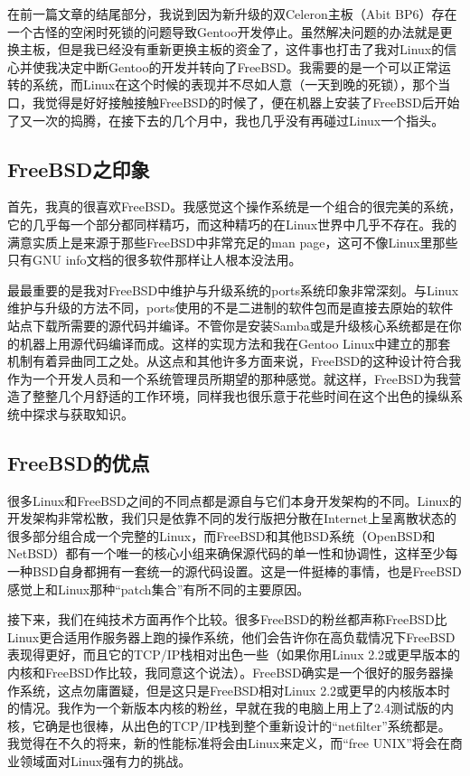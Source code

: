 在前一篇文章的结尾部分，我说到因为新升级的双Celeron主板（Abit BP6）存在一个古怪的空闲时死锁的问题导致Gentoo开发停止。虽然解决问题的办法就是更换主板，但是我已经没有重新更换主板的资金了，这件事也打击了我对Linux的信心并使我决定中断Gentoo的开发并转向了FreeBSD。我需要的是一个可以正常运转的系统，而Linux在这个时候的表现并不尽如人意（一天到晚的死锁），那个当口，我觉得是好好接触接触FreeBSD的时候了，便在机器上安装了FreeBSD后开始了又一次的捣腾，在接下去的几个月中，我也几乎没有再碰过Linux一个指头。

\subsection{FreeBSD之印象}

首先，我真的很喜欢FreeBSD。我感觉这个操作系统是一个组合的很完美的系统，它的几乎每一个部分都同样精巧，而这种精巧的在Linux世界中几乎不存在。我的满意实质上是来源于那些FreeBSD中非常充足的man page，这可不像Linux里那些只有GNU info文档的很多软件那样让人根本没法用。

最最重要的是我对FreeBSD中维护与升级系统的ports系统印象非常深刻。与Linux维护与升级的方法不同，ports使用的不是二进制的软件包而是直接去原始的软件站点下载所需要的源代码并编译。不管你是安装Samba或是升级核心系统都是在你的机器上用源代码编译而成。这样的实现方法和我在Gentoo Linux中建立的那套机制有着异曲同工之处。从这点和其他许多方面来说，FreeBSD的这种设计符合我作为一个开发人员和一个系统管理员所期望的那种感觉。就这样，FreeBSD为我营造了整整几个月舒适的工作环境，同样我也很乐意于花些时间在这个出色的操纵系统中探求与获取知识。

\subsection{FreeBSD的优点}

很多Linux和FreeBSD之间的不同点都是源自与它们本身开发架构的不同。Linux的开发架构非常松散，我们只是依靠不同的发行版把分散在Internet上呈离散状态的很多部分组合成一个完整的Linux，而FreeBSD和其他BSD系统（OpenBSD和NetBSD）都有一个唯一的核心小组来确保源代码的单一性和协调性，这样至少每一种BSD自身都拥有一套统一的源代码设置。这是一件挺棒的事情，也是FreeBSD感觉上和Linux那种“patch集合”有所不同的主要原因。

接下来，我们在纯技术方面再作个比较。很多FreeBSD的粉丝都声称FreeBSD比Linux更合适用作服务器上跑的操作系统，他们会告许你在高负载情况下FreeBSD表现得更好，而且它的TCP/IP栈相对出色一些（如果你用Linux 2.2或更早版本的内核和FreeBSD作比较，我同意这个说法）。FreeBSD确实是一个很好的服务器操作系统，这点勿庸置疑，但是这只是FreeBSD相对Linux 2.2或更早的内核版本时的情况。我作为一个新版本内核的粉丝，早就在我的电脑上用上了2.4测试版的内核，它确是也很棒，从出色的TCP/IP栈到整个重新设计的“netfilter”系统都是。我觉得在不久的将来，新的性能标准将会由Linux来定义，而“free UNIX”将会在商业领域面对Linux强有力的挑战。

